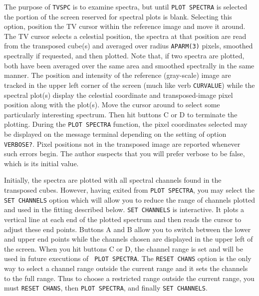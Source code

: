 \documentclass[twoside]{article}
\begin{document}
The purpose of {\tt TVSPC} is to examine spectra, but until {\tt PLOT
  SPECTRA} is selected the portion of the screen reserved for spectral
plots is blank.  Selecting this option, position the TV cursor within
the reference image and move it around.  The TV cursor selects a
celestial position, the spectra at that position are read from the
transposed cube(s) and averaged over radius {\tt APARM(3)} pixels,
smoothed spectrally if requested, and then plotted.  Note that, if two
spectra are plotted, both have been averaged over the same area and
smoothed spectrally in the same manner.  The position and intensity of
the reference (gray-scale) image are tracked in the upper left corner
of the screen (much like verb {\tt CURVALUE}) while the spectral
plot(s) display the celestial coordinate and transposed-image pixel
position along with the plot(s).  Move the cursor around to select
some particularly interesting spectrum.  Then hit buttons C or D to
terminate the plotting.  During the {\tt PLOT SPECTRA} function, the
pixel coordinates selected may be displayed on the message terminal
depending on the setting of option {\tt VERBOSE?}.  Pixel positions
not in the transposed image are reported whenever such errors begin.
The author suspects that you will prefer verbose to be false, which is
its initial value.

Initially, the spectra are plotted with all spectral channels found in
the transposed cubes.  However, having exited from {\tt PLOT SPECTRA},
you may select the {\tt SET CHANNELS} option which will allow you to
reduce the range of channels plotted and used in the fitting described
below.  {\tt SET CHANNELS} is interactive.  It plots a vertical line at
each end of the plotted spectrum and then reads the cursor to adjust
these end points.  Buttons A and B allow you to switch between the
lower and upper end points while the channels chosen are displayed in
the upper left of the screen.  When you hit buttons C or D, the
channel range is set and will be used in future executions of {\tt
  PLOT SPECTRA}\@.  The {\tt RESET CHANS} option is the only way to
select a channel range outside the current range and it sets the
channels to the full range.  Thus to choose a restricted range outside
the current range, you must {\tt RESET CHANS}, then {\tt PLOT
  SPECTRA}, and finally {\tt SET CHANNELS}\@.
\end{document}
